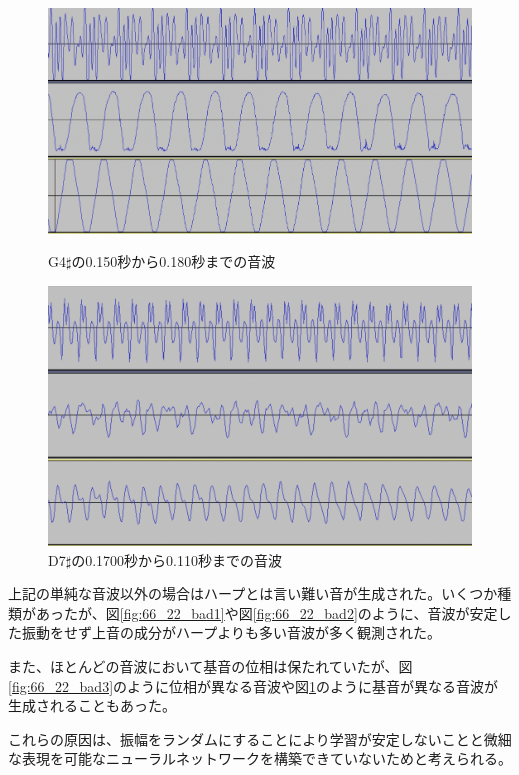 \begin{description}
\begin{figure}[t]
\begin{center}
\begin{minipage}{0.48\hsize}
\begin{center}
\includegraphics[width=0.9\hsize]{figure/66_22_det/g4s_0150_0180.png}
\caption{G4$\sharp$の0.150秒から0.180秒までの音波}
\label{fig:66_22_bad3}
\end{center}
\end{minipage}
\begin{minipage}{0.48\hsize}
\begin{center}
\includegraphics[width=0.9\hsize]{figure/66_22_det/d7s_0100_0110.png}
\caption{D7$\sharp$の0.1700秒から0.110秒までの音波}
\label{fig:66_22_bad4}
\end{center}
\end{minipage}
\end{center}
\end{figure}

上記の単純な音波以外の場合はハープとは言い難い音が生成された。いくつか種類があったが、図\ref{fig:66_22_bad1}や図\ref{fig:66_22_bad2}のように、音波が安定した振動をせず上音の成分がハープよりも多い音波が多く観測された。

また、ほとんどの音波において基音の位相は保たれていたが、図\ref{fig:66_22_bad3}のように位相が異なる音波や図\ref{fig:66_22_bad4}のように基音が異なる音波が生成されることもあった。

これらの原因は、振幅をランダムにすることにより学習が安定しないことと微細な表現を可能なニューラルネットワークを構築できていないためと考えられる。

\end{description}
